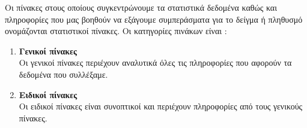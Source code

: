 Οι πίνακες στους οποίους συγκεντρώνουμε τα στατιστικά δεδομένα καθώς και πληροφορίες που μας βοηθούν να εξάγουμε συμπεράσματα για το δείγμα ή πληθυσμό ονομάζονται στατιστικοί πίνακες. Οι κατηγορίες πινάκων είναι :
\begin{enumerate}[label=\bf\arabic*.,itemsep=0mm]
\item \textbf{Γενικοί πίνακες}\\
Οι γενικοί πίνακες περιέχουν αναλυτικά όλες τις πληροφορίες που αφορούν τα δεδομένα που συλλέξαμε.
\item \textbf{Ειδικοί πίνακες}\\
Οι ειδικοί πίνακες είναι συνοπτικοί και περιέχουν πληροφορίες από τους γενικούς πίνακες.
\end{enumerate}
